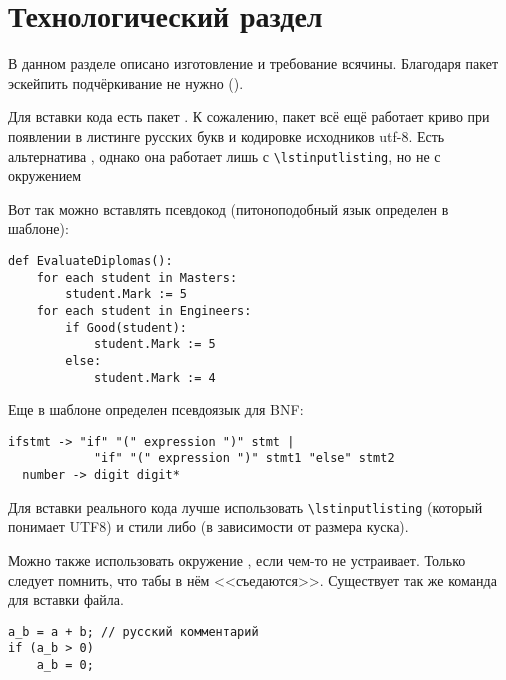 \chapter{Технологический раздел}
\label{cha:impl}

В данном разделе описано изготовление и требование всячины. Благодаря пакет  эскейпить подчёркивание  не нужно ().

Для вставки кода есть пакет . К сожалению, пакет  всё ещё
работает криво при появлении в листинге русских букв и кодировке исходников utf-8. Есть
альтернатива , однако она работает лишь с
\texttt{\textbackslash lstinputlisting}, но не с окружением 

Вот так можно вставлять псевдокод (питоноподобный язык определен в шаблоне):

\begin{lstlisting}[style=pseudocode,caption={Алгоритм оценки дипломных работ}]
def EvaluateDiplomas():
    for each student in Masters:
        student.Mark := 5
    for each student in Engineers:
        if Good(student):
            student.Mark := 5
        else:
            student.Mark := 4
\end{lstlisting}

Еще в шаблоне определен псевдоязык для BNF:

\begin{lstlisting}[style=grammar,basicstyle=\small,caption={Грамматика}]
  ifstmt -> "if" "(" expression ")" stmt |
            "if" "(" expression ")" stmt1 "else" stmt2
  number -> digit digit*
\end{lstlisting}

Для вставки реального кода лучше использовать \texttt{\textbackslash lstinputlisting} (который понимает
UTF8) и стили  либо  (в зависимости от размера куска).

Можно также использовать окружение , если  чем-то не
устраивает. Только следует помнить, что табы в нём <<съедаются>>. Существует так же команда  для вставки файла.

\begin{verbatim}
a_b = a + b; // русский комментарий
if (a_b > 0)
    a_b = 0;
\end{verbatim}

